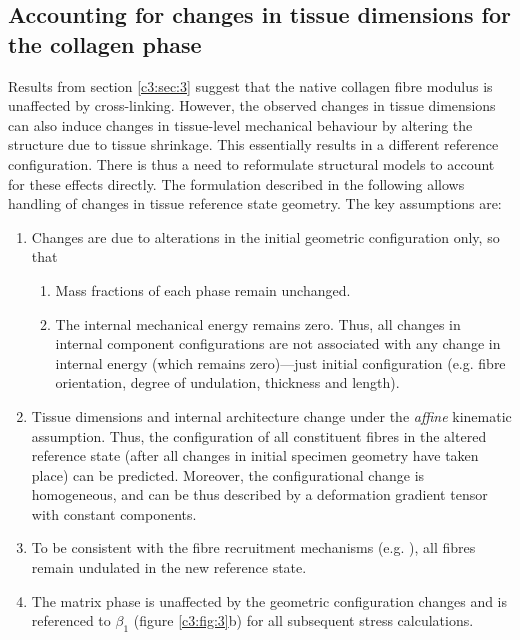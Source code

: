\subsection{Accounting for changes in tissue dimensions for the collagen phase} \label{c3:sec:42}

    Results from section \ref{c3:sec:3} suggest that the native collagen fibre modulus is unaffected by cross-linking. However, the observed changes in tissue dimensions can also induce changes in tissue-level mechanical behaviour by altering the structure due to tissue shrinkage. This essentially results in a different reference configuration. There is thus a need to reformulate structural models to account for these effects directly. The formulation described in the following allows handling of changes in tissue reference state geometry. The key assumptions are:
        \begin{enumerate}
            \item Changes are due to alterations in the initial geometric configuration only, so that
            \begin{enumerate}
                \item Mass fractions of each phase remain unchanged.
                \item The internal mechanical energy remains zero. Thus, all changes in internal component configurations are not associated with any change in internal energy (which remains zero)—just initial configuration (e.g. fibre orientation, degree of undulation, thickness and length).
            \end{enumerate}
            \item Tissue dimensions and internal architecture change under the \textit{affine} kinematic assumption. Thus, the configuration of all constituent fibres in the altered reference state (after all changes in initial specimen geometry have taken place) can be predicted. Moreover, the configurational change is homogeneous, and can be thus described by a deformation gradient tensor with constant components.
            \item To be consistent with the fibre recruitment mechanisms (e.g. \cite{sacks_incorporation_2003,fata_insights_2014}), all fibres remain undulated in the new reference state.
            \item The matrix phase is unaffected by the geometric configuration changes and is referenced to $\beta_1$ (figure \ref{c3:fig:3}b) for all subsequent stress calculations.
        \end{enumerate}
        
